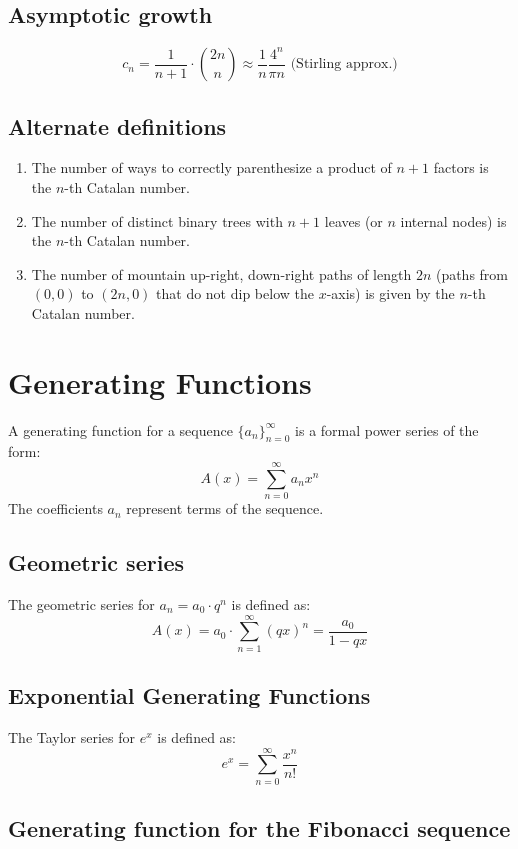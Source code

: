 \documentclass{article}
\begin{document}
\subsection{Asymptotic growth}

\[
c_n = \frac{1}{n+1} \cdot \binom{2n}{n} \approx \frac{1}{n} \frac{4^n}{\pi n} \text{ (Stirling approx.)}
\]


\subsection{Alternate definitions}

\begin{enumerate}
    \item The number of ways to correctly parenthesize a product of $n+1$ factors is the $n$-th Catalan number.
    \item The number of distinct binary trees with $n+1$ leaves (or $n$ internal nodes) is the $n$-th Catalan number.
    \item The number of mountain up-right, down-right paths of length $2n$ (paths from $(0,0)$ to $(2n,0)$ that do not dip below the $x$-axis) is given by the $n$-th Catalan number.
\end{enumerate}

\section{Generating Functions}

A generating function for a sequence \( \{a_n\}_{n=0}^{\infty} \) is a formal power series of the form:
\[ A(x) = \sum_{n=0}^{\infty} a_n x^n \]
The coefficients \( a_n \) represent terms of the sequence.

\subsection{Geometric series}

The geometric series for $a_n=a_0\cdot q^n$ is defined as:
\[ A(x) = a_0 \cdot \sum_{n=1}^{\infty} (qx)^{n} = \frac{a_0}{1-qx}\]

\subsection{Exponential Generating Functions}

The Taylor series for $e^x$ is defined as:
\[ e^{x} = \sum_{n=0}^{\infty} \frac{x^n}{n!} \]

\subsection{Generating function for the Fibonacci sequence}
\end{document}
